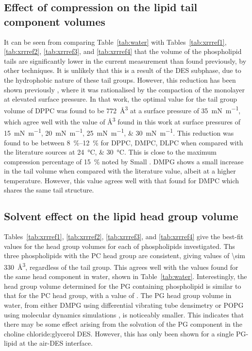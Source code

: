 \subsection{Effect of compression on the lipid tail component volumes}
It can be seen from comparing Table~\ref{tab:water} with Tables~\ref{tab:xrrref1}, \ref{tab:xrrref2}, \ref{tab:xrrref3}, and \ref{tab:xrrref4} that the volume of the phospholipid tails are significantly lower in the current measurement than found previously, by other techniques.
It is unlikely that this is a result of the DES subphase, due to the hydrophobic nature of these tail groups.
However, this reduction has been shown previously \cite{campbell_structure_2018}, where it was rationalised by the compaction of the monolayer at elevated surface pressure.
In that work, the optimal value for the tail group volume of DPPC was found to be \SI{772}{\angstrom\cubed} at a surface pressure of \SI{35}{\milli\newton\per\meter}, which agree well with the value of \si{\angstrom\cubed} found in this work at surface pressures of \SIlist{15;20;25;30}{\milli\newton\per\meter}.
This reduction was found to be between \SIrange{8}{12}{\percent} for DPPC, DMPC, DLPC when compared with the literature sources at \SIlist{24;30}{\celsius}.
This is close to the maximum compression percentage of \SI{15}{\percent} noted by Small \cite{small_lateral_1984}.
DMPG shows a small increase in the tail volume when compared with the literature value, albeit at a higher temperature.
However, this value agrees well with that found for DMPC which shares the same tail structure.

\subsection{Solvent effect on the lipid head group volume}
Tables~\ref{tab:xrrref1}, \ref{tab:xrrref2}, \ref{tab:xrrref3}, and \ref{tab:xrrref4} give the best-fit values for the head group volumes for each of phospholipids investigated.
Ths three phospholipids with the PC head group are consistent, giving values of \SI{\sim 330}{\angstrom\cubed}, regardless of the tail group.
This agrees well with the values found for the same head component in water, shown in Table~\ref{tab:water}.
Interestingly, the head group volume determined for the PG containing phospholipid is similar to that for the PC head group, with a value of .
The PG head group volume in water, from either DMPG using differential vibrating tube densimetry \cite{pan_molecular_2012} or POPG using molecular dynamics simulations \cite{kucerka_scattering_2012}, is noticeably smaller.
This indicates that there may be some effect arising from the solvation of the PG component in the choline chloride:glycerol DES.
However, this has only been shown for a single PG-lipid at the air-DES interface.

